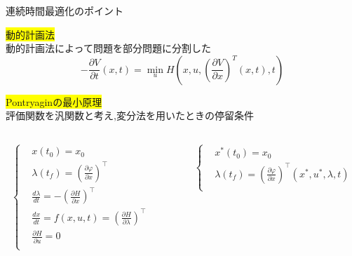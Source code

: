 \documentclass[twocolumn, dvipdfmx,12pt]{beamer}
\begin{document}
    \begin{frame}{連続時間最適化のポイント}
        \footnotesize

        \colorbox{yellow}{動的計画法} \\
        \qquad 動的計画法によって問題を部分問題に分割した
        \begin{equation*}
            -\frac{\partial V}{\partial t}\left(x,t\right) = \min _u H\left(x, u, \left( \frac{\partial V}{\partial x} \right)^T\left(x, t\right), t \right)
        \end{equation*}
       
        \colorbox{yellow}{Pontryaginの最小原理} \\
        \qquad 評価関数を汎関数と考え,変分法を用いたときの停留条件
       
        \begin{columns}
            \begin{column}{0.45\textwidth}
                \begin{align*}
                    \begin{cases}
                        &x(t_0)=x_0 \\
                        &\lambda(t_f)=\left(\frac{\partial \varphi}{\partial x}\right)^\top \\
                        &\frac{d\lambda}{dt}=-\left(\frac{\partial H}{\partial x}\right)^\top\\
                        &\frac{dx}{dt}=f(x,u,t)=\left(\frac{\partial H}{\partial \lambda}\right)^\top \\
                        &\frac{\partial H}{\partial u}=0 \\
                    \end{cases}
                \end{align*}
            \end{column}
            \begin{column}{0.1\textwidth}
            \end{column}
            \begin{column}{0.45\textwidth}
                \begin{align*}
                    \begin{cases}
                        &x^*(t_0)=x_0 \\
                        &\lambda(t_f)=\left(\frac{\partial \varphi}{\partial x}\right)^\top(x^*, u^*, \lambda, t) \\

\end{cases}
\end{align*}
\end{column}
\end{columns}
\end{frame}
\end{document}
